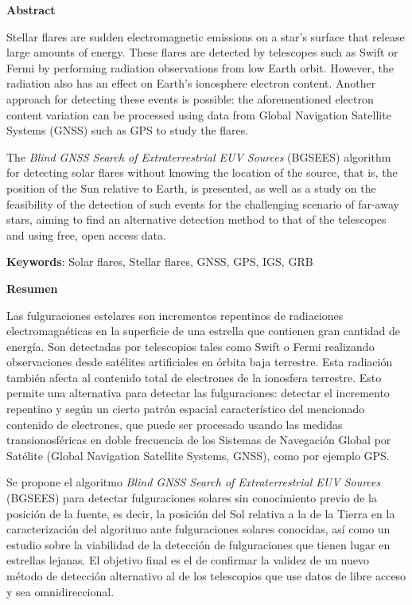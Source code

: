 \thispagestyle{empty}
\begin{center}
    \Large
    \textbf{Abstract}
\end{center}
Stellar flares are sudden electromagnetic emissions on a star's surface that release large amounts of energy. These flares are detected by telescopes such as Swift or Fermi by performing radiation observations from low Earth orbit. However, the radiation also has an effect on Earth’s ionosphere electron content. Another approach for detecting these events is possible: the aforementioned electron content variation can be processed using data from Global Navigation Satellite Systems (GNSS) such as GPS to study the flares.

The \textit{Blind GNSS Search of Extraterrestrial EUV Sources} (BGSEES) algorithm for detecting solar flares without knowing the location of the source, that is, the position of the Sun relative to Earth, is presented, as well as a study on the feasibility of the detection of such events for the challenging scenario of far-away stars, aiming to find an alternative detection method to that of the telescopes and using free, open access data.

\textbf{Keywords}: Solar flares, Stellar flares, GNSS, GPS, IGS, GRB

\clearpage
\thispagestyle{empty}
\begin{center}
	\Large
	\textbf{Resumen}
\end{center}
Las fulguraciones estelares son incrementos repentinos de radiaciones electromagnéticas en la superficie de una estrella que contienen gran cantidad de energía. Son detectadas por telescopios tales como Swift o Fermi realizando observaciones desde satélites artificiales en órbita baja terrestre. Esta radiación también afecta al contenido total de electrones de la ionosfera terrestre. Esto permite una alternativa para detectar las fulguraciones: detectar el incremento repentino y según un cierto patrón espacial característico del mencionado contenido de electrones, que puede ser procesado usando las medidas transionosféricas en doble frecuencia de los Sistemas de Navegación Global por Satélite (Global Navigation Satellite Systems, GNSS), como por ejemplo GPS.

Se propone el algoritmo \textit{Blind GNSS Search of Extraterrestrial EUV Sources} (BGSEES) para detectar fulguraciones solares sin conocimiento previo de la posición de la fuente, es decir, la posición del Sol relativa a la de la Tierra en la caracterización del algoritmo ante fulguraciones solares conocidas, así como un estudio sobre la viabilidad de la detección de fulguraciones que tienen lugar en estrellas lejanas. El objetivo final es el de confirmar la validez de un nuevo método de detección alternativo al de los telescopios que use datos de libre acceso y sea omnidireccional.

